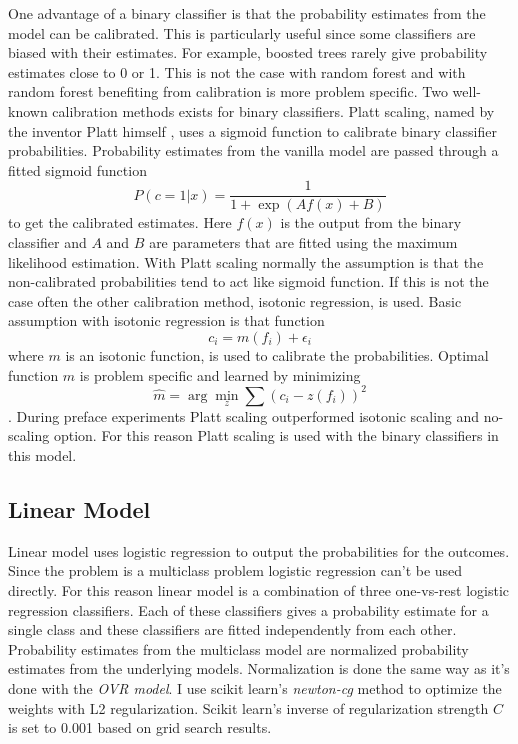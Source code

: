One advantage of a binary classifier is that the probability estimates from the model can be calibrated. This is particularly useful since some classifiers are biased with their estimates. For example, boosted trees rarely give probability estimates close to 0 or 1. This is not the case with random forest and with random forest benefiting from calibration is more problem specific. \cite{niculescu2005predicting} Two well-known calibration methods exists for binary classifiers. Platt scaling, named by the inventor Platt himself \cite{platt1999probabilistic}, uses a sigmoid function to calibrate binary classifier probabilities. Probability estimates from the vanilla model are passed through a fitted sigmoid function
\begin{equation}
P ( c = 1 | x ) = \frac { 1 } { 1 + \exp ( A f(x) + B ) }
\end{equation}
to get the calibrated estimates. Here $f(x)$ is the output from the binary classifier and $A$ and $B$ are parameters that are fitted using the maximum likelihood estimation. With Platt scaling normally the assumption is that the non-calibrated probabilities tend to act like sigmoid function. If this is not the case often the other calibration method, isotonic regression, is used. Basic assumption with isotonic regression is that function
\begin{equation}
c _ { i } = m \left( f _ { i } \right) + \epsilon _ { i }
\end{equation}
where $m$ is an isotonic function, is used to calibrate the probabilities. Optimal function $m$ is problem specific and learned by minimizing
\begin{equation}
\hat { m } = \arg \min _ { z } \sum \left( c _ { i } - z \left( f _ { i } \right) \right) ^ { 2 }
\end{equation}
. \cite{zadrozny2002transforming} During preface experiments Platt scaling outperformed isotonic scaling and no-scaling option. For this reason Platt scaling is used with the binary classifiers in this model.

\subsection{Linear Model}
Linear model uses logistic regression to output the probabilities for the outcomes. Since the problem is a multiclass problem logistic regression can't be used directly. For this reason linear model is a combination of three one-vs-rest logistic regression classifiers. Each of these classifiers gives a probability estimate for a single class and these classifiers are fitted independently from each other. Probability estimates from the multiclass model are normalized probability estimates from the underlying models. Normalization is done the same way as it's done with the \textit{OVR model}. I use scikit learn's \textit{newton-cg} method \cite{scipy} to optimize the weights with L2 regularization. Scikit learn's inverse of regularization strength $C$ is set to 0.001 based on grid search results.

